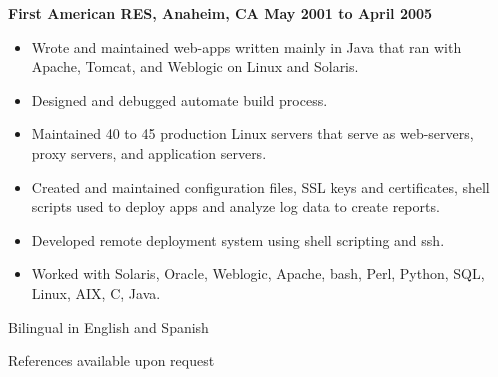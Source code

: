 \documentclass{res}
\begin{document}
\begin{resume}
\begin{itemize}
\end{itemize}


{\large \bf First American RES, Anaheim, CA \hfill May 2001 to April 2005}
\begin{itemize}

\item Wrote and maintained web-apps written mainly in Java that ran with
Apache, Tomcat, and Weblogic on Linux and Solaris.

\item Designed and debugged automate build process.

\item Maintained 40 to 45 production Linux servers that serve as
web-servers, proxy servers, and application servers.

\item Created and maintained configuration files, SSL keys and
certificates, shell scripts used to deploy apps and analyze log data to
create reports.

\item Developed remote deployment system using shell scripting and ssh.

\item  Worked with Solaris, Oracle, Weblogic, Apache, bash, Perl,
Python, SQL, Linux, AIX, C, Java.

\end{itemize}


Bilingual in English and Spanish

References available upon request

\end{resume}
\end{document}

